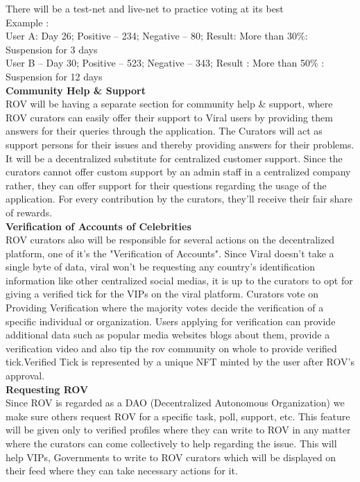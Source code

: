 \documentclass[10pt]{article}
\begin{document}
There will be a test-net and live-net to practice voting at its best\\

Example : \\

User A: Day 26; Positive – 234; Negative – 80; Result: More than 30\%: Suspension for 3 days\\
User B – Day 30; Positive – 523; Negative – 343; Result : More than 50\% : Suspension for 12 days\\


\textbf{Community Help \& Support}\\

ROV will be having a separate section for community help \& support, where ROV curators can easily offer their support to Viral users by providing them answers for their queries through the application. The Curators will act as support persons for their issues and thereby providing answers for their problems. It will be a decentralized substitute for centralized customer support. Since the curators cannot offer custom support by an admin staff in a centralized company rather, they can offer support for their questions regarding the usage of the application. For every contribution by the curators, they’ll receive their fair share of rewards.\\

\textbf{Verification of Accounts of Celebrities}\\

ROV curators also will be responsible for several actions on the decentralized platform, one of it's the "Verification of Accounts". Since Viral doesn’t take a single byte of data, viral won’t be requesting any country’s identification information like other centralized social medias, it is up to the curators to opt for giving a verified tick for the VIPs on the viral platform. Curators vote on Providing Verification where the majority votes decide the verification of a specific individual or organization. Users applying for verification can provide additional data such as popular media websites blogs about them, provide a verification video and also tip the rov community on whole to provide verified tick.Verified Tick is represented by a unique NFT minted by the user after ROV's approval.\\

\textbf{Requesting ROV}\\

Since ROV is regarded as a DAO (Decentralized Autonomous Organization) we make sure others request ROV for a specific task, poll, support, etc. This feature will be given only to verified profiles where they can write to ROV in any matter where the curators can come collectively to help regarding the issue. This will help VIPs, Governments to write to ROV curators which will be displayed on their feed where they can take necessary actions for it. \\
\end{document}
